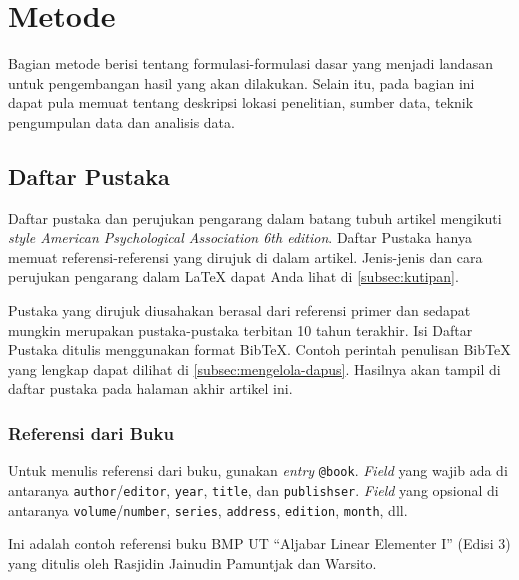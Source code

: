 \section{Metode} %


Bagian metode berisi tentang formulasi-formulasi dasar yang menjadi landasan untuk pengembangan hasil yang akan dilakukan. Selain itu, pada bagian ini dapat pula memuat tentang deskripsi lokasi penelitian, sumber data, teknik pengumpulan data dan analisis data.

\subsection{Daftar Pustaka}

Daftar pustaka dan perujukan pengarang dalam batang tubuh artikel mengikuti \textit{style American Psychological Association 6th edition}. Daftar Pustaka hanya memuat referensi-referensi yang dirujuk di dalam artikel. Jenis-jenis dan cara perujukan pengarang dalam LaTeX dapat Anda lihat di \autoref{subsec:kutipan}.

Pustaka yang dirujuk diusahakan berasal dari referensi primer dan sedapat mungkin merupakan pustaka-pustaka terbitan 10 tahun terakhir. Isi Daftar Pustaka ditulis menggunakan format BibTeX. Contoh perintah penulisan BibTeX yang lengkap dapat dilihat di \autoref{subsec:mengelola-dapus}. Hasilnya akan tampil di daftar pustaka pada halaman akhir artikel ini.

\subsubsection{Referensi dari Buku}

Untuk menulis referensi dari buku, gunakan \textit{entry} \verb|@book|. \textit{Field} yang wajib ada di antaranya \verb|author|/\verb|editor|, \verb|year|, \verb|title|, dan \verb|publishser|. \textit{Field} yang opsional di antaranya \verb|volume|/\verb|number|, \verb|series|, \verb|address|, \verb|edition|, \verb|month|, dll.

Ini adalah contoh referensi buku BMP UT ``Aljabar Linear Elementer I'' (Edisi 3) yang ditulis oleh Rasjidin Jainudin Pamuntjak dan Warsito.

